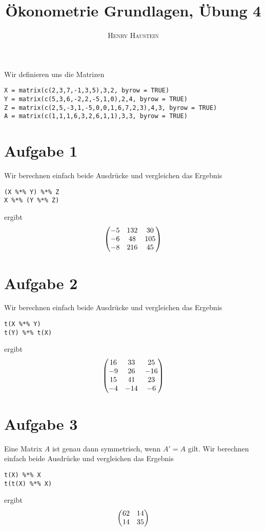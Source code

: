 \documentclass{article}
\title{\textbf{Ökonometrie Grundlagen, Übung 4}}
\author{\textsc{Henry Haustein}}
\date{}
\begin{document}
	\maketitle
	
	Wir definieren uns die Matrizen
	\begin{lstlisting}[style=R]
X = matrix(c(2,3,7,-1,3,5),3,2, byrow = TRUE)
Y = matrix(c(5,3,6,-2,2,-5,1,0),2,4, byrow = TRUE)
Z = matrix(c(2,5,-3,1,-5,0,0,1,6,7,2,3),4,3, byrow = TRUE)
A = matrix(c(1,1,1,6,3,2,6,1,1),3,3, byrow = TRUE)
	\end{lstlisting}
	
	\section*{Aufgabe 1}
	Wir berechnen einfach beide Ausdrücke und vergleichen das Ergebnis
	\begin{lstlisting}[style=R]
(X %*% Y) %*% Z
X %*% (Y %*% Z)
	\end{lstlisting}
	ergibt
	\begin{align}
		\begin{pmatrix}
			-5 & 132 & 30 \\ -6 & 48 & 105 \\ -8 & 216 & 45
		\end{pmatrix} \notag
	\end{align}
	
	\section*{Aufgabe 2}
	Wir berechnen einfach beide Ausdrücke und vergleichen das Ergebnis
	\begin{lstlisting}[style=R]
t(X %*% Y)
t(Y) %*% t(X)
	\end{lstlisting}
	ergibt
	\begin{align}
		\begin{pmatrix}
			16 & 33 & 25 \\ -9 & 26 & -16 \\ 15 & 41 & 23 \\ -4 & -14 & -6
		\end{pmatrix} \notag
	\end{align}
	
	\section*{Aufgabe 3}
	Eine Matrix $A$ ist genau dann symmetrisch, wenn $A'=A$ gilt. Wir berechnen einfach beide Ausdrücke und vergleichen das Ergebnis
	\begin{lstlisting}[style=R]
t(X) %*% X
t(t(X) %*% X)
	\end{lstlisting}
	ergibt
	\begin{align}
		\begin{pmatrix}
			62 & 14 \\ 14 & 35
		\end{pmatrix} \notag
	\end{align}
\end{document}
